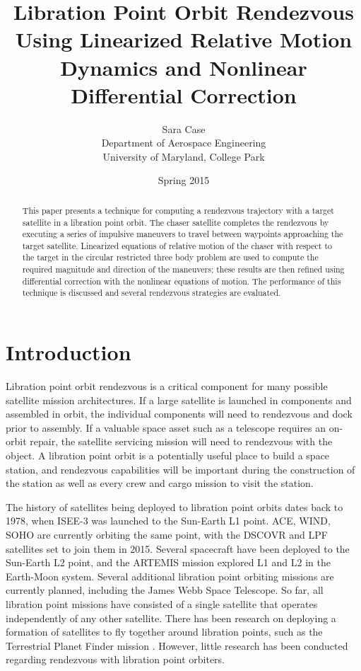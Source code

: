 \documentclass[a4paper]{article}
\title{Libration Point Orbit Rendezvous Using Linearized Relative Motion Dynamics and Nonlinear Differential Correction}
\author{Sara Case\\ Department of Aerospace Engineering\\ University of Maryland, College Park}
\date{Spring 2015}
\begin{document}
\maketitle

\begin{abstract}

This paper presents a technique for computing a rendezvous trajectory with a target satellite in a libration point orbit.  The chaser satellite completes the rendezvous by executing a series of impulsive maneuvers to travel between waypoints approaching the target satellite.  Linearized equations of relative motion of the chaser with respect to the target in the circular restricted three body problem are used to compute the required magnitude and direction of the maneuvers; these results are then refined using differential correction with the nonlinear equations of motion. The performance of this technique is discussed and several rendezvous strategies are evaluated.

\end{abstract}

\section{Introduction}
Libration point orbit rendezvous is a critical component for many possible satellite mission architectures.  If a large satellite is launched in components and assembled in orbit, the individual components will need to rendezvous and dock prior to assembly.  If a valuable space asset such as a telescope requires an on-orbit repair, the satellite servicing mission will need to rendezvous with the object.  A libration point orbit is a potentially useful place to build a space station, and rendezvous capabilities will be important during the construction of the station as well as every crew and cargo mission to visit the station.

The history of satellites being deployed to libration point orbits dates back to 1978, when ISEE-3 was launched to the Sun-Earth L1 point. ACE, WIND, SOHO are currently orbiting the same point, with the DSCOVR and LPF satellites set to join them in 2015.  Several spacecraft have been deployed to the Sun-Earth L2 point, and the ARTEMIS mission explored L1 and L2 in the Earth-Moon system.  Several additional libration point orbiting missions are currently planned, including the James Webb Space Telescope.  So far, all libration point missions have consisted of a single satellite that operates independently of any other satellite.  There has been research on deploying a formation of satellites to fly together around libration points, such as the Terrestrial Planet Finder mission \cite{beichman2004}.  However, little research has been conducted regarding rendezvous with libration point orbiters. %
\end{document}
